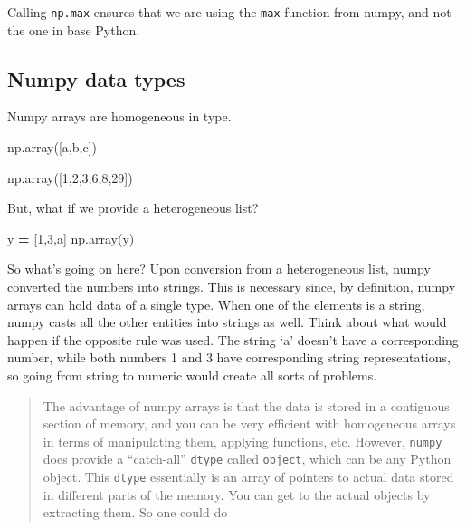 \documentclass[
  letterpaper,
]{scrbook}
\newenvironment{Shaded}{\begin{snugshade}}{\end{snugshade}}
\newcommand{\DecValTok}[1]{\textcolor[rgb]{0.00,0.00,0.81}{#1}}
\newcommand{\NormalTok}[1]{#1}
\newcommand{\OperatorTok}[1]{\textcolor[rgb]{0.81,0.36,0.00}{\textbf{#1}}}
\newcommand{\StringTok}[1]{\textcolor[rgb]{0.31,0.60,0.02}{#1}}
\begin{document}
Calling \texttt{np.max} ensures that we are using the \texttt{max} function from numpy, and not the one in base Python.

\hypertarget{numpy-data-types}{%
\subsection{Numpy data types}\label{numpy-data-types}}

Numpy arrays are homogeneous in type.

\begin{Shaded}
\begin{Highlighting}[]
\NormalTok{np.array([}\StringTok{\textquotesingle{}a\textquotesingle{}}\NormalTok{,}\StringTok{\textquotesingle{}b\textquotesingle{}}\NormalTok{,}\StringTok{\textquotesingle{}c\textquotesingle{}}\NormalTok{])}
\end{Highlighting}
\end{Shaded}

\begin{Shaded}
\begin{Highlighting}[]
\NormalTok{np.array([}\DecValTok{1}\NormalTok{,}\DecValTok{2}\NormalTok{,}\DecValTok{3}\NormalTok{,}\DecValTok{6}\NormalTok{,}\DecValTok{8}\NormalTok{,}\DecValTok{29}\NormalTok{])}
\end{Highlighting}
\end{Shaded}

But, what if we provide a heterogeneous list?

\begin{Shaded}
\begin{Highlighting}[]
\NormalTok{y }\OperatorTok{=}\NormalTok{ [}\DecValTok{1}\NormalTok{,}\DecValTok{3}\NormalTok{,}\StringTok{\textquotesingle{}a\textquotesingle{}}\NormalTok{]}
\NormalTok{np.array(y)}
\end{Highlighting}
\end{Shaded}

So what's going on here? Upon conversion from a heterogeneous list, numpy converted the numbers into strings. This is necessary since, by definition, numpy arrays can hold data of a single type. When one of the elements is a string, numpy casts all the other entities into strings as well. Think about what would happen if the opposite rule was used. The string `a' doesn't have a corresponding number, while both numbers 1 and 3 have corresponding string representations, so going from string to numeric would create all sorts of problems.

\begin{quote}
The advantage of numpy arrays is that the data is stored in a contiguous section of memory, and you can be very efficient with homogeneous arrays in terms of manipulating them, applying functions, etc. However, \texttt{numpy} does provide a ``catch-all'' \texttt{dtype} called \texttt{object}, which can be any Python object. This \texttt{dtype} essentially is an array of pointers to actual data stored in different parts of the memory. You can get to the actual objects by extracting them. So one could do
\end{quote}
\end{document}
